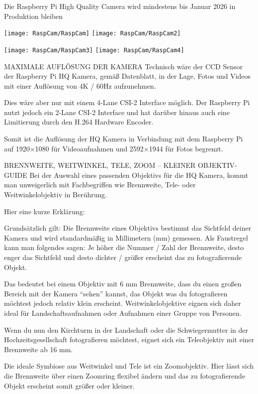 Die Raspberry Pi High Quality Camera wird mindestens bis Januar 2026 in Produktion bleiben



\bigskip

\texttt{[image: RaspCam/RaspCam]} \quad \texttt{[image: RaspCam/RaspCam2]}

\texttt{[image: RaspCam/RaspCam3]} 
\quad
\texttt{[image: RaspCam/RaspCam4]}


MAXIMALE AUFLÖSUNG DER KAMERA
Technisch wäre der CCD Sensor der Raspberry Pi HQ Kamera, gemäß Datenblatt, in der Lage, Fotos und Videos mit einer Auflösung von 4K / 60Hz aufzunehmen.

Dies wäre aber nur mit einem 4-Lane CSI-2 Interface möglich.
Der Raspberry Pi nutzt jedoch ein 2-Lane CSI-2 Interface und hat darüber hinaus auch eine Limitierung durch den H.264 Hardware Encoder.

Somit ist die Auflösung der HQ Kamera in Verbindung mit dem Raspberry Pi auf 1920×1080 für Videoaufnahmen und 2592×1944 für Fotos begrenzt.

BRENNWEITE, WEITWINKEL, TELE, ZOOM – KLEINER OBJEKTIV-GUIDE
Bei der Auswahl eines passenden Objektivs für die HQ Kamera, kommt man unweigerlich mit Fachbegriffen wie Brennweite, Tele- oder Weitwinkelobjektiv in Berührung.

Hier eine kurze Erklärung:

Grundsätzlich gilt: Die Brennweite eines Objektivs bestimmt das Sichtfeld deiner Kamera und wird standardmäßig in Millimetern (mm) gemessen.
Als Faustregel kann man folgendes sagen: Je höher die Nummer / Zahl der Brennweite, desto enger das Sichtfeld und desto dichter / größer erscheint das zu fotografierende Objekt.

Das bedeutet bei einem Objektiv mit 6 mm Brennweite, dass du einen großen Bereich mit der Kamera “sehen” kannst, das Objekt was du fotografieren möchtest jedoch relativ klein erscheint.
Weitwinkelobjektive eignen sich daher ideal für Landschaftsaufnahmen oder Aufnahmen einer Gruppe von Personen.

Wenn du nun den Kirchturm in der Landschaft oder die Schwiegermutter in der Hochzeitsgesellschaft fotografieren möchtest, eignet sich ein Teleobjektiv mit einer Brennweite ab 16 mm.

Die ideale Symbiose aus Weitwinkel und Tele ist ein Zoomobjektiv. Hier lässt sich die Brennweite über einen Zoomring flexibel ändern und das zu fotografierende Objekt erscheint somit größer oder kleiner.


